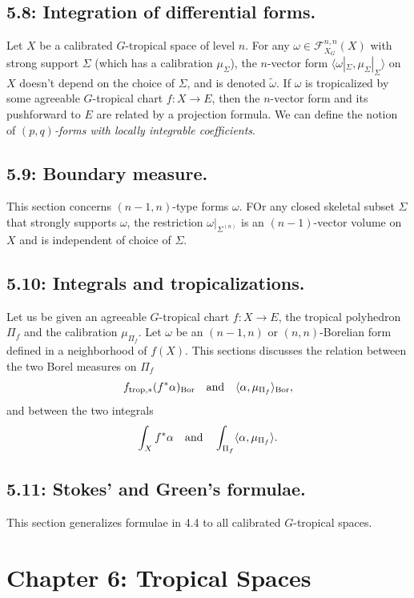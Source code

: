 \documentclass[12pt,reqno]{amsart}
\theoremstyle{definition}
\theoremstyle{remark}
\theoremstyle{citedrem}
\theoremstyle{cited}
\theoremstyle{citeddef}
\theoremstyle{step}
\begin{document}
\subsection*{5.8: Integration of differential forms.}
Let $X$ be a calibrated $G$-tropical space of level $n$. For any $\omega \in \mathcal{F}^{n,n}_{X_G}(X)$ with strong support $\Sigma$ (which has a calibration $\mu_\Sigma$), the $n$-vector form $\langle \omega|_{\Sigma}, \mu_{\Sigma}|_\Sigma \rangle$ on $X$ doesn't depend on the choice of $\Sigma$, and is denoted $\widetilde{\omega}$. If $\omega$ is tropicalized by some agreeable $G$-tropical chart $f \colon X \to E$, then the $n$-vector form and its pushforward to $E$ are related by a projection formula. We can define the notion of \emph{$(p,q)$-forms with locally integrable coefficients}. 

\subsection*{5.9: Boundary measure.} This section concerns $(n-1,n)$-type forms $\omega$. FOr any closed skeletal subset $\Sigma$ that strongly supports $\omega$, the restriction $\omega|_{\Sigma^{(n)}}$ is an $(n-1)$-vector volume on $X$ and is independent of choice of $\Sigma$. 

\subsection*{5.10: Integrals and tropicalizations.} Let us be given an agreeable $G$-tropical chart $f \colon X \to E$, the tropical polyhedron $\Pi_f$ and the calibration $\mu_{\Pi_f}$. Let $\omega$ be an $(n-1, n)$ or $(n,n)$-Borelian form defined in a neighborhood of $f(X)$. This sections discusses the relation between the two Borel measures on $\Pi_f$ 
\[f_{\mathrm{trop},*}(f^*\alpha)_{\mathrm{Bor}} \text{\,\,\,\,  and  \,\,\,\,} \langle \alpha, \mu_{\Pi_f}\rangle_{\mathrm{Bor}}, \] and between the two integrals \[\int_X f^* \alpha \text{\,\,\,\,  and  \,\,\,\,} \int_{\Pi_f} \langle \alpha, \mu_{\Pi_f}\rangle.\]

\subsection*{5.11: Stokes' and Green's formulae. }
This section generalizes formulae in 4.4 to all calibrated $G$-tropical spaces. 

\section*{Chapter 6: Tropical Spaces}
\end{document}
